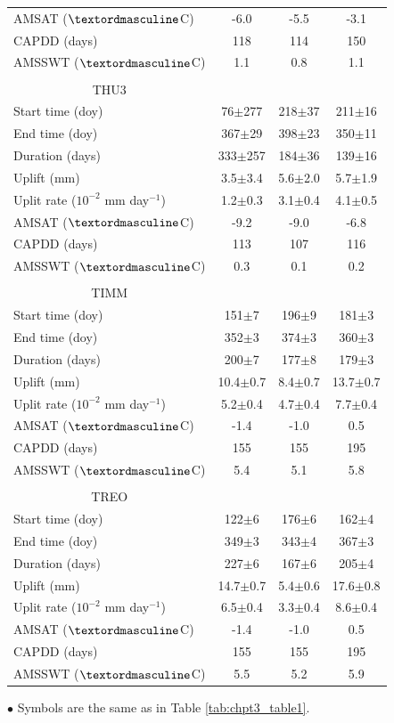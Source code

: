 \begin{center}
\begin{ThreePartTable}
\begin{longtable}{lccc}
AMSAT ($\textordmasculine$C)&-6.0&-5.5&-3.1\\
CAPDD (days)&118&114&150\\
AMSSWT ($\textordmasculine$C)&1.1&0.8&1.1\\
&  &  & \\		
\multicolumn{1}{c}{THU3} & & & \\
Start time (doy)&76$\pm$277&218$\pm$37&211$\pm$16\\
End time (doy)&367$\pm$29&398$\pm$23&350$\pm$11\\
Duration (days)&333$\pm$257&184$\pm$36&139$\pm$16\\
Uplift (mm)&3.5$\pm$3.4&5.6$\pm$2.0&5.7$\pm$1.9\\
Uplit rate ($10^{-2}$ mm day$^{-1}$)&1.2$\pm$0.3&3.1$\pm$0.4&4.1$\pm$0.5\\
AMSAT ($\textordmasculine$C)&-9.2&-9.0&-6.8\\
CAPDD (days)&113&107&116\\
AMSSWT ($\textordmasculine$C)&0.3&0.1&0.2\\
&  &  & \\
\multicolumn{1}{c}{TIMM} & & & \\
Start time (doy)&151$\pm$7&196$\pm$9&181$\pm$3\\
End time (doy)&352$\pm$3&374$\pm$3&360$\pm$3\\
Duration (days)&200$\pm$7&177$\pm$8&179$\pm$3\\
Uplift (mm)&10.4$\pm$0.7&8.4$\pm$0.7&13.7$\pm$0.7\\
Uplit rate ($10^{-2}$ mm day$^{-1}$)&5.2$\pm$0.4&4.7$\pm$0.4&7.7$\pm$0.4\\
AMSAT ($\textordmasculine$C)&-1.4&-1.0&0.5\\
CAPDD (days)&155&155&195\\
AMSSWT ($\textordmasculine$C)&5.4&5.1&5.8\\
&  &  & \\
\multicolumn{1}{c}{TREO} & & & \\
Start time (doy)&122$\pm$6&176$\pm$6&162$\pm$4\\
End time (doy)&349$\pm$3&343$\pm$4&367$\pm$3\\
Duration (days)&227$\pm$6&167$\pm$6&205$\pm$4\\
Uplift (mm)&14.7$\pm$0.7&5.4$\pm$0.6&17.6$\pm$0.8\\
Uplit rate ($10^{-2}$ mm day$^{-1}$)&6.5$\pm$0.4&3.3$\pm$0.4&8.6$\pm$0.4\\
AMSAT ($\textordmasculine$C)&-1.4&-1.0&0.5\\
CAPDD (days)&155&155&195\\
AMSSWT ($\textordmasculine$C)&5.5&5.2&5.9\\
\midrule	
\end{longtable}
	\begin{tablenotes}
		\small
		\item $\bullet$ Symbols are the same as in Table \ref{tab:chpt3_table1}.
	\end{tablenotes}
	\label{tab:SI_chpt3_table3}
\end{ThreePartTable}
\end{center}

